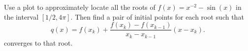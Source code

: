\begin{statement}{1}
  Use a plot to approximately locate all the roots of
  $f(x) = x^{-2} - \sin(x)$
  in the interval $[1/2, 4 \pi]$.
  Then find a pair of initial points for each root such that
  \[
    q(x) = f(x_k) + \frac{f(x_k) - f(x_{k - 1})}{x_k - x_{k - 1}} (x - x_k).
  \]
  converges to that root.
\end{statement}